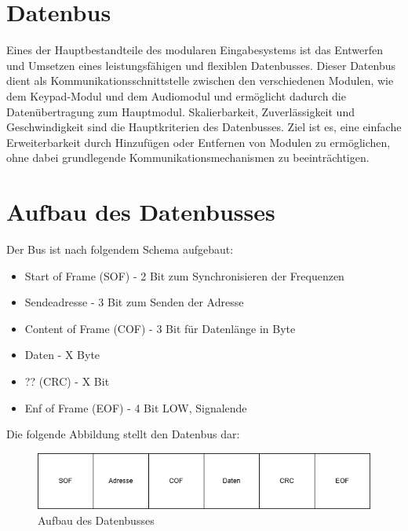 \section{Datenbus}
Eines der Hauptbestandteile des modularen Eingabesystems ist das Entwerfen und Umsetzen eines leistungsfähigen und flexiblen Datenbusses. Dieser Datenbus dient als Kommunikationsschnittstelle zwischen den verschiedenen Modulen, wie dem Keypad-Modul und dem Audiomodul und ermöglicht dadurch die Datenübertragung zum Hauptmodul. Skalierbarkeit, Zuverlässigkeit und Geschwindigkeit sind die Hauptkriterien des Datenbusses. Ziel ist es, eine einfache Erweiterbarkeit durch Hinzufügen oder Entfernen von Modulen zu ermöglichen, ohne dabei grundlegende Kommunikationsmechanismen zu beeinträchtigen.

\section{Aufbau des Datenbusses}
Der Bus ist nach folgendem Schema aufgebaut:
\begin{itemize}
    \item Start of Frame (SOF) - 2 Bit zum Synchronisieren der Frequenzen
    \item Sendeadresse -  3 Bit zum Senden der Adresse
    \item Content of Frame (COF) - 3 Bit für Datenlänge in Byte
    \item Daten - X Byte
    \item ?? (CRC) - X Bit
    \item Enf of Frame (EOF) - 4 Bit LOW, Signalende
\end{itemize}

Die folgende Abbildung stellt den Datenbus dar:
\begin{figure}[H]
    \centering    
    \includegraphics[width=1\textwidth]{Bilder/datenbus.png}
    \caption{Aufbau des Datenbusses}
    \label{Datenbus}
\end{figure}
